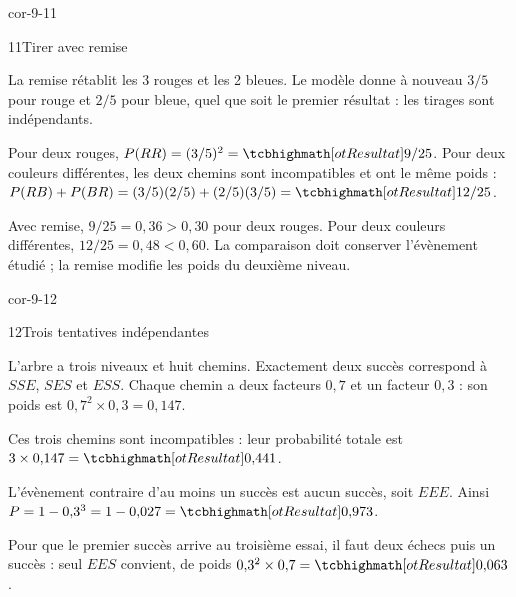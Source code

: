 \begin{blocLivre}{cor-9-11}
\begin{corrige}{11}{Tirer avec remise}
\begin{questions}
\item La remise rétablit les 3 rouges et les 2 bleues. Le modèle donne à nouveau $3/5$ pour rouge et $2/5$ pour bleue, quel que soit le premier résultat : les tirages sont indépendants.
\item Pour deux rouges, $P(RR)=(3/5)^2=\res{9/25}$.
Pour deux couleurs différentes, les deux chemins sont incompatibles et ont le même poids :
$P(RB)+P(BR)=(3/5)(2/5)+(2/5)(3/5)=\res{12/25}$.
\item Avec remise, $9/25=0{,}36>0{,}30$ pour deux rouges.
Pour deux couleurs différentes, $12/25=0{,}48<0{,}60$.
La comparaison doit conserver l’évènement étudié ; la remise modifie les poids du deuxième niveau.
\end{questions}

\label{figlivre-r09-11-cor}

\end{corrige}
\end{blocLivre}
\begin{blocLivre}{cor-9-12}
\begin{corrige}{12}{Trois tentatives indépendantes}
\begin{questions}
\item L’arbre a trois niveaux et huit chemins. Exactement deux succès correspond à $SSE$, $SES$ et $ESS$.
Chaque chemin a deux facteurs $0{,}7$ et un facteur $0{,}3$ : son poids est $0{,}7^2\times0{,}3=0{,}147$.
\item Ces trois chemins sont incompatibles : leur probabilité totale est $3\times0{,}147=\res{0{,}441}$.
\item L’évènement contraire d’au moins un succès est aucun succès, soit $EEE$.
Ainsi $P=1-0{,}3^3=1-0{,}027=\res{0{,}973}$.
\item Pour que le premier succès arrive au troisième essai, il faut deux échecs puis un succès :
seul $EES$ convient, de poids $0{,}3^2\times0{,}7=\res{0{,}063}$.
\end{questions}

\label{figlivre-r09-12-cor}

\end{corrige}
\end{blocLivre}
